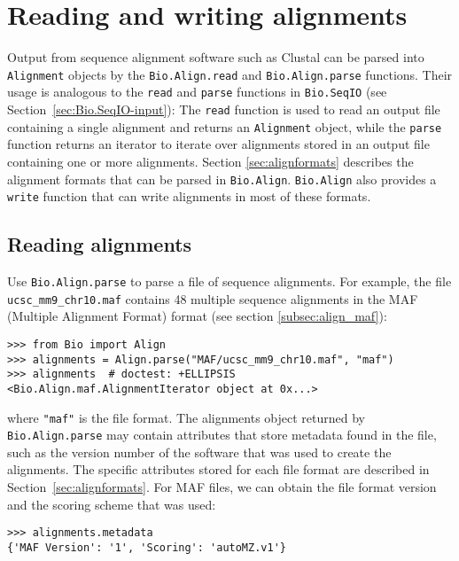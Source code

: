 \section{Reading and writing alignments}
\label{sec:alignmentparsers}

Output from sequence alignment software such as Clustal can be parsed into \verb|Alignment| objects by the \verb|Bio.Align.read| and \verb|Bio.Align.parse| functions. Their usage is analogous to the \verb|read| and \verb|parse| functions in \verb|Bio.SeqIO| (see Section~\ref{sec:Bio.SeqIO-input}): The \verb|read| function is used to read an output file containing a single alignment and returns an \verb|Alignment| object, while the \verb|parse| function returns an iterator to iterate over alignments stored in an output file containing one or more alignments. Section \ref{sec:alignformats} describes  the alignment formats that can be parsed in \verb|Bio.Align|.  \verb|Bio.Align| also provides a \verb|write| function that can write alignments in most of these formats.

\subsection{Reading alignments}
\label{subsec:align_reading}

Use \verb|Bio.Align.parse| to parse a file of sequence alignments. For example, the file \verb|ucsc_mm9_chr10.maf| contains 48 multiple sequence alignments in the MAF (Multiple Alignment Format) format (see section \ref{subsec:align_maf}):

\begin{verbatim}
>>> from Bio import Align
>>> alignments = Align.parse("MAF/ucsc_mm9_chr10.maf", "maf")
>>> alignments  # doctest: +ELLIPSIS
<Bio.Align.maf.AlignmentIterator object at 0x...>
\end{verbatim}
where \verb|"maf"| is the file format.
The alignments object returned by \verb|Bio.Align.parse| may contain attributes that store metadata found in the file, such as the version number of the software that was used to create the alignments. The specific attributes stored for each file format are described in Section~\ref{sec:alignformats}. For MAF files, we can obtain the file format version and the scoring scheme that was used:
\begin{verbatim}
>>> alignments.metadata
{'MAF Version': '1', 'Scoring': 'autoMZ.v1'}
\end{verbatim}

